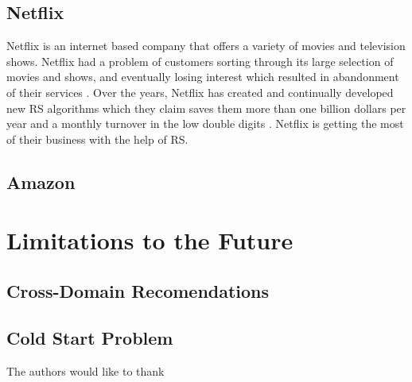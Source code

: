 \documentclass[sigconf]{acmart}
\begin{document}
\subsection{Netflix}
Netflix is an internet based company that offers a variety of movies and television shows. Netflix had a problem of customers sorting through its large selection of movies and shows, and eventually losing interest which resulted in abandonment of their services \cite{Gomez-Uribe2015}. Over the years, Netflix has created and continually developed new RS algorithms which they claim saves them more than one billion dollars per year and a monthly turnover in the low double digits \cite{Gomez-Uribe2015}. Netflix is getting the most of their business with the help of RS.
\subsection{Amazon}

\section{Limitations to the Future}
\subsection{Cross-Domain Recomendations}
\subsection{Cold Start Problem}

\begin{acks}

  The authors would like to thank 

\end{acks}


 
\end{document}
